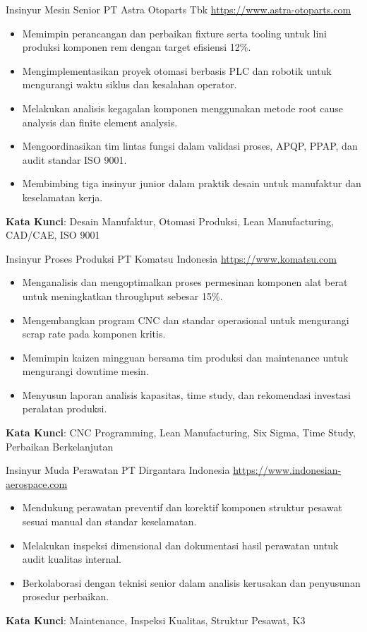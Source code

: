 \documentclass[a4paper, serif, 10pt]{moderncv}
\begin{document}
        {Insinyur Mesin Senior}
        {PT Astra Otoparts Tbk}
        {\url{https://www.astra-otoparts.com}}
        {}
        {\begin{itemize}
\item Memimpin perancangan dan perbaikan fixture serta tooling untuk lini produksi komponen rem dengan target efisiensi 12\%.
\item Mengimplementasikan proyek otomasi berbasis PLC dan robotik untuk mengurangi waktu siklus dan kesalahan operator.
\item Melakukan analisis kegagalan komponen menggunakan metode root cause analysis dan finite element analysis.
\item Mengoordinasikan tim lintas fungsi dalam validasi proses, APQP, PPAP, dan audit standar ISO 9001.
\item Membimbing tiga insinyur junior dalam praktik desain untuk manufaktur dan keselamatan kerja.
\end{itemize}
\textbf{Kata Kunci}: Desain Manufaktur, Otomasi Produksi, Lean Manufacturing, CAD/CAE, ISO 9001}

        {Insinyur Proses Produksi}
        {PT Komatsu Indonesia}
        {\url{https://www.komatsu.com}}
        {}
        {\begin{itemize}
\item Menganalisis dan mengoptimalkan proses permesinan komponen alat berat untuk meningkatkan throughput sebesar 15\%.
\item Mengembangkan program CNC dan standar operasional untuk mengurangi scrap rate pada komponen kritis.
\item Memimpin kaizen mingguan bersama tim produksi dan maintenance untuk mengurangi downtime mesin.
\item Menyusun laporan analisis kapasitas, time study, dan rekomendasi investasi peralatan produksi.
\end{itemize}
\textbf{Kata Kunci}: CNC Programming, Lean Manufacturing, Six Sigma, Time Study, Perbaikan Berkelanjutan}

        {Insinyur Muda Perawatan}
        {PT Dirgantara Indonesia}
        {\url{https://www.indonesian-aerospace.com}}
        {}
        {\begin{itemize}
\item Mendukung perawatan preventif dan korektif komponen struktur pesawat sesuai manual dan standar keselamatan.
\item Melakukan inspeksi dimensional dan dokumentasi hasil perawatan untuk audit kualitas internal.
\item Berkolaborasi dengan teknisi senior dalam analisis kerusakan dan penyusunan prosedur perbaikan.
\end{itemize}
\textbf{Kata Kunci}: Maintenance, Inspeksi Kualitas, Struktur Pesawat, K3}
\end{document}
